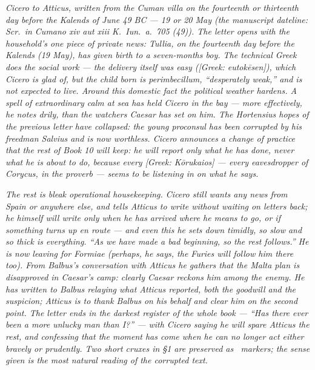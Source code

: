 
\textit{Cicero to Atticus, written from the Cuman villa
on the fourteenth or thirteenth day before the Kalends
of June 49 BC --- 19 or 20 May (the manuscript dateline:
\textit{Scr.\ in Cumano xiv aut xiii K.\ Iun.\ a.\ 705
(49)}). The letter opens with the household's one piece
of private news: Tullia, on the fourteenth day before
the Kalends (19 May), has given birth to a seven-months
boy. The technical Greek does the social work --- the
delivery itself was easy (\textit{[Greek: eutok\=esen]}),
which Cicero is glad of, but the child born is
\textit{perimbecillum}, ``desperately weak,'' and is
not expected to live. Around this domestic fact the
political weather hardens. A spell of extraordinary
calm at sea has held Cicero in the bay --- more
effectively, he notes drily, than the watchers Caesar
has set on him. The Hortensius hopes of the previous
letter have collapsed: the young proconsul has been
corrupted by his freedman Salvius and is now worthless.
Cicero announces a change of practice that the rest
of Book 10 will keep: he will report only what he has
done, never what he is about to do, because every
\textit{[Greek: K\=orukaios]} --- every eavesdropper
of Corycus, in the proverb --- seems to be listening
in on what he says.}

\textit{The rest is bleak operational housekeeping.
Cicero still wants any news from Spain or anywhere
else, and tells Atticus to write without waiting on
letters back; he himself will write only when he has
arrived where he means to go, or if something turns up
en route --- and even this he sets down timidly, so
slow and so thick is everything. ``As we have made a
bad beginning, so the rest follows.'' He is now leaving
for Formiae (perhaps, he says, the Furies will follow
him there too). From Balbus's conversation with
Atticus he gathers that the Malta plan is disapproved
in Caesar's camp: clearly Caesar reckons him among the
enemy. He has written to Balbus relaying what Atticus
reported, both the goodwill and the suspicion;
Atticus is to thank Balbus on his behalf and clear
him on the second point. The letter ends in the
darkest register of the whole book --- ``Has there ever
been a more unlucky man than I?'' --- with Cicero
saying he will spare Atticus the rest, and confessing
that the moment has come when he can no longer act
either bravely or prudently. Two short cruxes in \S1
are preserved as \dag\ markers; the sense given is the
most natural reading of the corrupted text.}
